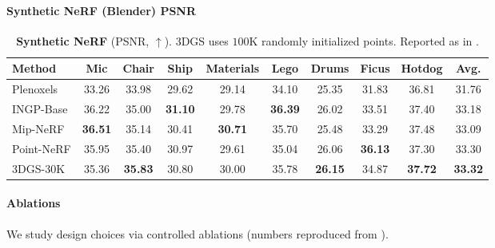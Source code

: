 \begin{enrichment}
\begin{enrichment}
\begin{enrichment}
        \paragraph{Synthetic NeRF (Blender) PSNR}
        \begin{table}[H]
            \centering\scriptsize
            \caption{\textbf{Synthetic NeRF} (PSNR, $\uparrow$). 3DGS uses $100$K randomly initialized points.  Reported as in \cite{kerbl2023_3dgaussiansplatting}.}
            \label{tab:chapter23_synthetic}
            \setlength\tabcolsep{5pt}
            \begin{tabular}{lccccccccc}
                \toprule
                Method & Mic & Chair & Ship & Materials & Lego & Drums & Ficus & Hotdog & Avg. \\
                \midrule
                Plenoxels & 33.26 & 33.98 & 29.62 & 29.14 & 34.10 & 25.35 & 31.83 & 36.81 & 31.76 \\
                INGP-Base & 36.22 & 35.00 & \textbf{31.10} & 29.78 & \textbf{36.39} & 26.02 & 33.51 & 37.40 & 33.18 \\
                Mip-NeRF  & \textbf{36.51} & 35.14 & 30.41 & \textbf{30.71} & 35.70 & 25.48 & 33.29 & 37.48 & 33.09 \\
                Point-NeRF & 35.95 & 35.40 & 30.97 & 29.61 & 35.04 & 26.06 & \textbf{36.13} & 37.30 & 33.30 \\
                3DGS-30K  & 35.36 & \textbf{35.83} & 30.80 & 30.00 & 35.78 & \textbf{26.15} & 34.87 & \textbf{37.72} & \textbf{33.32} \\
                \bottomrule
            \end{tabular}
        \end{table}
        
        \paragraph{Ablations}
        We study design choices via controlled ablations (numbers reproduced from \cite{kerbl2023_3dgaussiansplatting}).
        

\end{enrichment}
\end{enrichment}
\end{enrichment}
